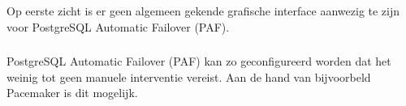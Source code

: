 \subsubsection{}
\label{subsubsec:Grafische interface}

Op eerste zicht is er geen algemeen gekende grafische interface aanwezig te zijn voor PostgreSQL Automatic Failover (PAF).

\subsubsection{}
\label{subsubsec:Beperkte manuele interventie}

PostgreSQL Automatic Failover (PAF) kan zo geconfigureerd worden dat het weinig tot geen manuele interventie vereist. Aan de hand van bijvoorbeld Pacemaker is dit mogelijk.
